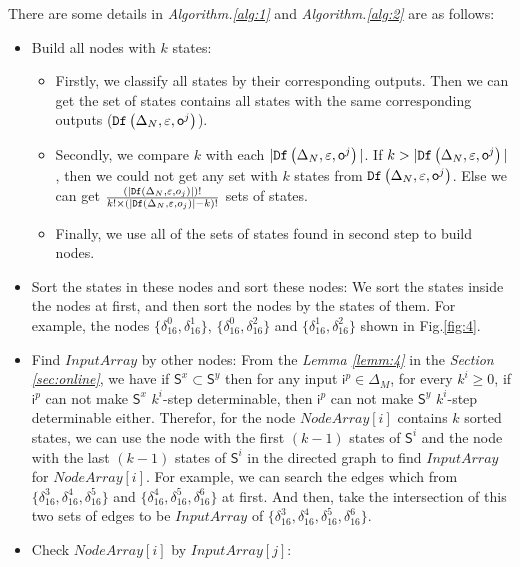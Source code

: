 There are some details in {\em Algorithm.\ref{alg:1}} and {\em Algorithm.\ref{alg:2}} are as follows:
\begin{itemize}
\item Build all nodes with $k$ states:
\begin{itemize}
\item Firstly, we classify all states by their corresponding outputs. Then we can get the set of states contains all states with the same corresponding outputs (${\tt Df}\left(\Delta_N,\varepsilon,\mathsf{o}^{j}\right)$).
\item Secondly, we compare $k$ with each $|{\tt Df}\left(\Delta_N,\varepsilon,\mathsf{o}^{j}\right)|$. If $k>|{\tt Df}\left(\Delta_N,\varepsilon,\mathsf{o}^{j}\right)|$, then we could not get any set with $k$ states from ${\tt Df}\left(\Delta_N,\varepsilon,\mathsf{o}^{j}\right)$. Else we can get $\frac{(|{\tt Df}\left(\Delta_N,\varepsilon,o_j\right)|)!}{k!\times (|{\tt Df}\left(\Delta_N,\varepsilon,o_j\right)|-k)!}$ sets of states.
\item Finally, we use all of the sets of states found in second step to build nodes. 
\end{itemize} 
 \item Sort the states in these nodes and sort these nodes: We sort the states inside the nodes at first, and then sort the nodes by the states of them. For example, the nodes $\{\delta_{16}^0,\delta_{16}^1\}$, $\{\delta_{16}^0,\delta_{16}^2\}$ and $\{\delta_{16}^1,\delta_{16}^2\}$ shown in Fig.\ref{fig:4}. 
  \item Find $InputArray$ by other nodes: From the {\em Lemma \ref{lemm:4}} in the {\em Section \ref{sec:online}}, we have if $\mathsf{S}^{x}\subset \mathsf{S}^{y}$ then for any input $\mathsf{i}^p\in \Delta_M$, for every $k^{i}\ge0$, if $\mathsf{i}^p$ can not make $\mathsf{S}^{x}$ $k^i$-step determinable, then $\mathsf{i}^p$ can not make $\mathsf{S}^{y}$ $k^i$-step determinable either. Therefor, for the node $NodeArray[i]$ contains $k$ sorted states, we can use the node with the first $(k-1)$ states of $\mathsf{S}^i$ and the node with the last $(k-1)$ states of $\mathsf{S}^i$ in the directed graph to find $InputArray$ for $NodeArray[i]$. For example, we can search the edges which from $\{\delta_{16}^3,\delta_{16}^4,\delta_{16}^5\}$ and $\{\delta_{16}^4,\delta_{16}^5,\delta_{16}^6\}$ at first. And then, take the intersection of this two sets of edges to be $InputArray$ of $\{\delta_{16}^3,\delta_{16}^4,\delta_{16}^5,\delta_{16}^6\}$. 
  \item Check $NodeArray[i]$ by $InputArray[j]$:
     

\end{itemize}
